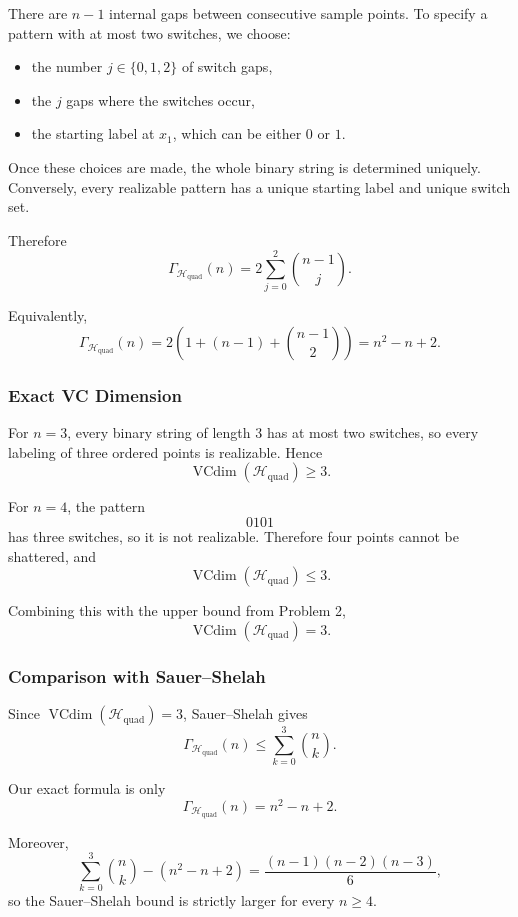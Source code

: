 \documentclass{article}
\begin{document}
There are $n-1$ internal gaps between consecutive sample points. To specify a pattern with at most two switches, we choose:
\begin{itemize}
\item the number $j \in \{0,1,2\}$ of switch gaps,
\item the $j$ gaps where the switches occur,
\item the starting label at $x_1$, which can be either $0$ or $1$.
\end{itemize}

Once these choices are made, the whole binary string is determined uniquely. Conversely, every realizable pattern has a unique starting label and unique switch set.

Therefore
$$
\Gamma_{\mathcal{H}_{\mathrm{quad}}}(n)
=
2 \sum_{j=0}^2 \binom{n-1}{j}.
$$

Equivalently,
$$
\Gamma_{\mathcal{H}_{\mathrm{quad}}}(n)
=
2\left(1 + (n-1) + \binom{n-1}{2}\right)
=
n^2 - n + 2.
$$

\subsubsection{Exact VC Dimension}

For $n=3$, every binary string of length $3$ has at most two switches, so every labeling of three ordered points is realizable. Hence
$$
\operatorname{VCdim}(\mathcal{H}_{\mathrm{quad}}) \ge 3.
$$

For $n=4$, the pattern
$$
0101
$$
has three switches, so it is not realizable. Therefore four points cannot be shattered, and
$$
\operatorname{VCdim}(\mathcal{H}_{\mathrm{quad}}) \le 3.
$$

Combining this with the upper bound from Problem 2,
$$
\operatorname{VCdim}(\mathcal{H}_{\mathrm{quad}}) = 3.
$$

\subsubsection{Comparison with Sauer--Shelah}

Since $\operatorname{VCdim}(\mathcal{H}_{\mathrm{quad}})=3$, Sauer--Shelah gives
$$
\Gamma_{\mathcal{H}_{\mathrm{quad}}}(n)
\le
\sum_{k=0}^3 \binom{n}{k}.
$$

Our exact formula is only
$$
\Gamma_{\mathcal{H}_{\mathrm{quad}}}(n)
=
n^2 - n + 2.
$$

Moreover,
$$
\sum_{k=0}^3 \binom{n}{k} - (n^2-n+2)
=
\frac{(n-1)(n-2)(n-3)}{6},
$$
so the Sauer--Shelah bound is strictly larger for every $n \ge 4$.
\end{document}
